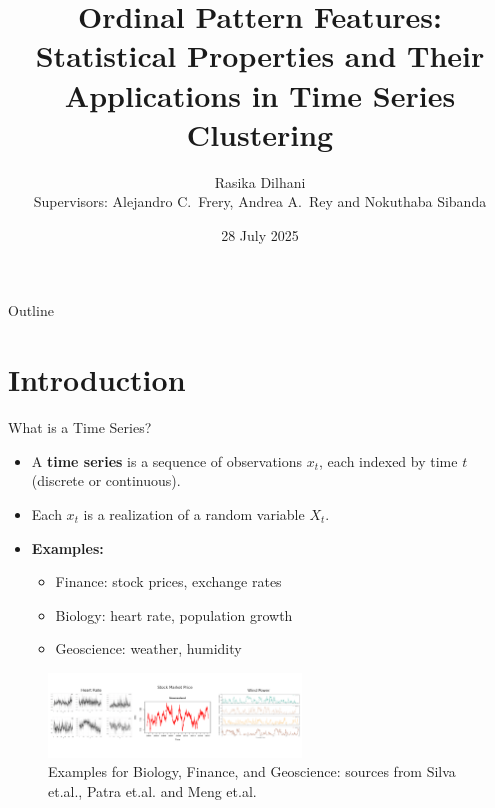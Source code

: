 \documentclass{beamer}
\title{Ordinal Pattern Features: Statistical Properties and Their Applications in Time Series Clustering}
\author[Rasika Dilhani]{{Rasika Dilhani}\\{\small Supervisors: Alejandro C.\ Frery, Andrea A.\ Rey and Nokuthaba Sibanda}}
\institute[VUW]{Victoria University of Wellington}
\date{28 July 2025}
\begin{document}
\maketitle
\begin{frame}{Outline}
    \tableofcontents
\end{frame}

\section{Introduction}

\begin{frame}{What is a Time Series?}
	\begin{itemize}
		\item A \textbf{time series} is a sequence of observations $x_t$, each indexed by time $t$ (discrete or continuous).
		\item Each $x_t$ is a realization of a random variable $X_t$.
		\item \textbf{Examples:}
		\begin{itemize}
			\item Finance: stock prices, exchange rates
			\item Biology: heart rate, population growth
			\item Geoscience: weather, humidity
		\end{itemize}
		\end{itemize}
		\begin{figure}[hbt]
			\centering
			\includegraphics[width=0.6\textwidth]{time series plots}
			\caption{Examples for Biology, Finance, and Geoscience: sources from Silva et.al., Patra et.al. and Meng et.al.~\cite{Silva2023,Patra2022,Meng2023}}
			\label{fig:timeseries}
		\end{figure}	
\end{frame}
\end{document}
